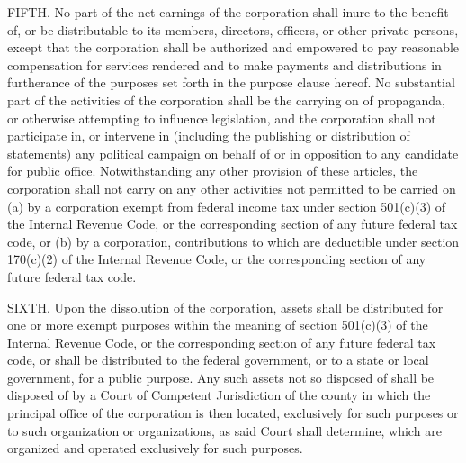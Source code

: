 FIFTH. No part of the net earnings of the corporation shall inure to the benefit of, or be distributable to its members, directors, officers, or other private persons, except that the corporation shall be authorized and empowered to pay reasonable compensation for services rendered and to make payments and distributions in furtherance of the purposes set forth in the purpose clause hereof. No substantial part of the activities of the corporation shall be the carrying on of propaganda, or otherwise attempting to influence legislation, and the corporation shall not participate in, or intervene in (including the publishing or distribution of statements) any political campaign on behalf of or in opposition to any candidate for public office. Notwithstanding any other provision of these articles, the corporation shall not carry on any other activities not permitted to be carried on (a) by a corporation exempt from federal income tax under section 501(c)(3) of the Internal Revenue Code, or the corresponding section of any future federal tax code, or (b) by a corporation, contributions to which are deductible under section 170(c)(2) of the Internal Revenue Code, or the corresponding section of any future federal tax code.

SIXTH. Upon the dissolution of the corporation, assets shall be distributed for one or more exempt purposes within the meaning of section 501(c)(3) of the Internal Revenue Code, or the corresponding section of any future federal tax code, or shall be distributed to the federal government, or to a state or local government, for a public purpose. Any such assets not so disposed of shall be disposed of by a Court of Competent Jurisdiction of the county in which the principal office of the corporation is then located, exclusively for such purposes or to such organization or organizations, as said Court shall determine, which are organized and operated exclusively for such purposes.
    
    